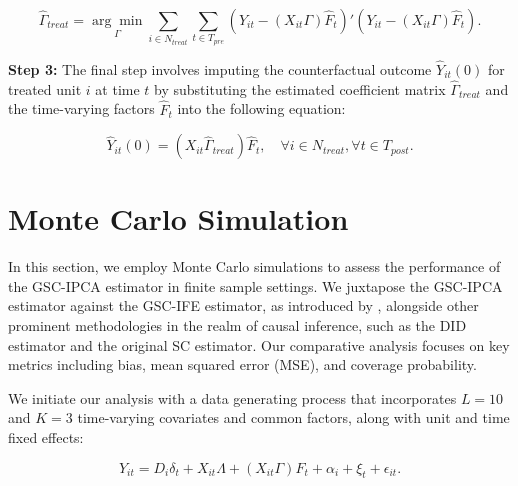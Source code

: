 \documentclass[12pt]{article}
\begin{document}
\begin{equation}
\hat{\Gamma}_{treat} = \underset{\Gamma}{\arg\min} \sum_{i \in N_{treat}} \sum_{t \in T_{pre}} \left( Y_{it} - (X_{it} \Gamma) \hat{F}_{t} \right)' \left( Y_{it} - (X_{it} \Gamma) \hat{F}_{t} \right).
\tag{4}
\end{equation}

\textbf{Step 3:} The final step involves imputing the counterfactual outcome $\hat{Y}_{it}(0)$ for treated unit $i$ at time $t$ by substituting the estimated coefficient matrix $\hat{\Gamma}_{treat}$ and the time-varying factors $\hat{F}_t$ into the following equation:

\begin{equation}
\hat{Y}_{it}(0) = (X_{it} \hat{\Gamma}_{treat}) \hat{F}_{t}, \quad \forall i \in N_{treat}, \forall t \in T_{post}.
\tag{5}
\end{equation}
\section{Monte Carlo Simulation}
\label{sec: simulation}

In this section, we employ Monte Carlo simulations to assess the performance of the GSC-IPCA estimator in finite sample settings. We juxtapose the GSC-IPCA estimator against the GSC-IFE estimator, as introduced by \cite{xu2017generalized}, alongside other prominent methodologies in the realm of causal inference, such as the DID estimator and the original SC estimator. Our comparative analysis focuses on key metrics including bias, mean squared error (MSE), and coverage probability. 

We initiate our analysis with a data generating process that incorporates $L=10$ and $K=3$ time-varying covariates and common factors, along with unit and time fixed effects:

\begin{equation}
Y_{it} = D_{i} \delta_{t} + X_{it}\Lambda + (X_{it}\Gamma) F_{t} + \alpha_i + \xi_t + \epsilon_{it}.
\tag{6}
\label{eq: dgp}
\end{equation}
\end{document}
